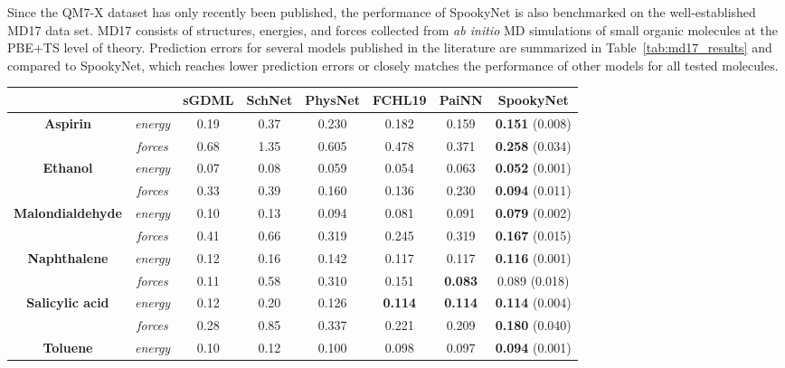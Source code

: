\documentclass[%
superscriptaddress,
reprint,
nofootinbib,
amsmath,amssymb,amsfonts,
floatfix,
altaffilletter,
showkeys,
]{revtex4-2}
\newcommand{\nn}{SpookyNet}
\begin{document}
Since the QM7-X dataset has only recently been published, the performance of \nn{} is also benchmarked on the well-established MD17 data set.\cite{chmiela2017machine}
MD17 consists of structures, energies, and forces collected from \textit{ab initio} MD simulations of small organic molecules at the PBE+TS\cite{perdew1996generalized,tkatchenko2009accurate} level of theory.  %
Prediction errors for several models published in the literature are summarized in Table~\ref{tab:md17_results} and compared to \nn{}, which reaches lower prediction errors or closely matches the performance of other models for all tested molecules.
\begin{table*}
	\begin{tabular}{c c c c c c c c}
		\toprule
		& & \bf sGDML\cite{chmiela2019sgdml} & \bf SchNet\cite{schutt2018schnet} & \bf PhysNet\cite{unke2019physnet} & \bf FCHL19\cite{christensen2020fchl} & \bf PaiNN\cite{schutt2021equivariant} & \bf \nn{} \\
		\midrule
		\multirow{2}{*}{\bf Aspirin} & \it energy & 0.19 & 0.37 & 0.230 & 0.182 & 0.159 & {\bf 0.151} (0.008) \\
		& \it forces & 0.68 & 1.35 & 0.605 & 0.478 & 0.371 & {\bf 0.258} (0.034) \\
		\midrule
		\multirow{2}{*}{\bf Ethanol} & \it energy & 0.07 & 0.08 & 0.059 & 0.054 & 0.063 & {\bf 0.052} (0.001)\\
		& \it forces & 0.33 & 0.39 & 0.160 & 0.136 & 0.230 & {\bf 0.094} (0.011) \\
		\midrule
		\multirow{2}{*}{\bf Malondialdehyde} & \it energy & 0.10 & 0.13 & 0.094 & 0.081 & 0.091 & {\bf 0.079} (0.002)\\
		& \it forces & 0.41 & 0.66 & 0.319 & 0.245 & 0.319 & {\bf 0.167} (0.015) \\
		\midrule
		\multirow{2}{*}{\bf Naphthalene} & \it energy & 0.12 & 0.16 & 0.142 & 0.117 & 0.117 & {\bf 0.116} (0.001)\\
		& \it forces & 0.11 & 0.58 & 0.310 & 0.151 & \bf 0.083 & 0.089 (0.018) \\
		\midrule
		\multirow{2}{*}{\bf Salicylic acid} & \it energy & 0.12 & 0.20 & 0.126 & \bf 0.114 & \bf 0.114 & {\bf 0.114} (0.004)\\
		& \it forces & 0.28 & 0.85 & 0.337 & 0.221 & 0.209 & {\bf 0.180} (0.040) \\
		\midrule
		\multirow{2}{*}{\bf Toluene} & \it energy & 0.10 & 0.12 & 0.100 & 0.098 & 0.097 & {\bf 0.094} (0.001) \\

\end{tabular}
\end{table*}
\end{document}
